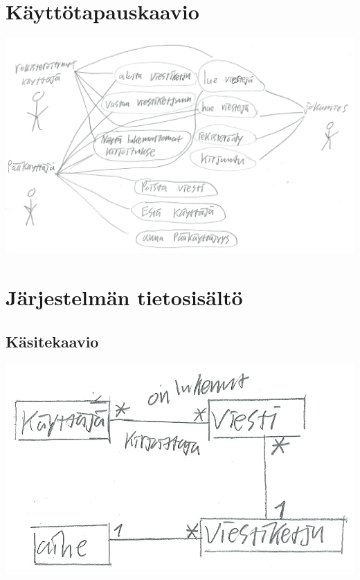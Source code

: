 \documentclass[a4paper, 12pt, finnish]{article}
\begin{document}
\newpage

\section{Käyttötapauskaavio}
\includegraphics[width=\textwidth,height=\textheight,keepaspectratio]{kayttotapauskaavio.png}

\newpage

\section{Järjestelmän tietosisältö}
\subsection{Käsitekaavio}
\includegraphics[width=\textwidth,height=\textheight,keepaspectratio]{kasitekaavio.png}
\end{document}
